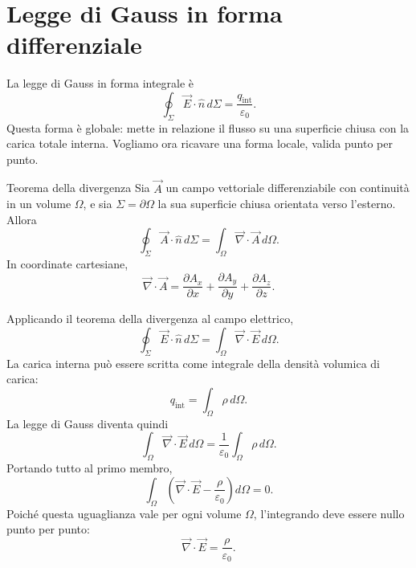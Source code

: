 \documentclass[a4paper]{article}
\begin{document}
\begin{center}
\end{center}

\section{Legge di Gauss in forma differenziale}

La legge di Gauss in forma integrale è
\[
    \oint_\Sigma \vec{E}\cdot\hat{n}\,d\Sigma
    =\frac{q_{\mathrm{int}}}{\varepsilon_0}.
\]
Questa forma è globale: mette in relazione il flusso su una superficie chiusa con la carica totale interna. Vogliamo ora ricavare una forma locale, valida punto per punto.

\begin{snippettheorem}{Teorema della divergenza}
    Sia \(\vec{A}\) un campo vettoriale differenziabile con continuità in un volume \(\Omega\), e sia \(\Sigma=\partial\Omega\) la sua superficie chiusa orientata verso l'esterno. Allora
    \[
        \oint_\Sigma \vec{A}\cdot\hat{n}\,d\Sigma
        =\int_\Omega \vec{\nabla}\cdot\vec{A}\,d\Omega.
    \]
    In coordinate cartesiane,
    \[
        \vec{\nabla}\cdot\vec{A}=\frac{\partial A_x}{\partial x}+\frac{\partial A_y}{\partial y}+\frac{\partial A_z}{\partial z}.
    \]
\end{snippettheorem}

Applicando il teorema della divergenza al campo elettrico,
\[
    \oint_\Sigma \vec{E}\cdot\hat{n}\,d\Sigma
    =\int_\Omega \vec{\nabla}\cdot\vec{E}\,d\Omega.
\]
La carica interna può essere scritta come integrale della densità volumica di carica:
\[
    q_{\mathrm{int}}=\int_\Omega \rho\,d\Omega.
\]
La legge di Gauss diventa quindi
\[
    \int_\Omega \vec{\nabla}\cdot\vec{E}\,d\Omega
    =\frac{1}{\varepsilon_0}\int_\Omega \rho\,d\Omega.
\]
Portando tutto al primo membro,
\[
    \int_\Omega \left(\vec{\nabla}\cdot\vec{E}-\frac{\rho}{\varepsilon_0}\right)d\Omega=0.
\]
Poiché questa uguaglianza vale per ogni volume \(\Omega\), l'integrando deve essere nullo punto per punto:
\[
    \vec{\nabla}\cdot\vec{E}=\frac{\rho}{\varepsilon_0}.
\]
\end{document}
